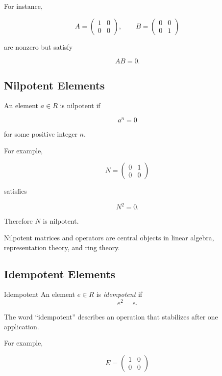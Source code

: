 For instance,

\[ A=\begin{pmatrix}1&0\\0&0\end{pmatrix},\qquad
B=\begin{pmatrix}0&0\\0&1\end{pmatrix} \]

are nonzero but satisfy

\[ AB=0. \]

\subsection{Nilpotent Elements}
\label{subsec:noncommutative-nilpotent}

An element \(a\in R\) is nilpotent if

\[ a^n=0 \]

for some positive integer \(n\).

For example,

\[ N=\begin{pmatrix}0&1\\0&0\end{pmatrix} \]

satisfies

\[ N^2=0. \]

Therefore \(N\) is nilpotent.

Nilpotent matrices and operators are central objects in linear algebra,
representation theory, and ring theory.

\subsection{Idempotent Elements}
\label{subsec:idempotent-elements}

\begin{definitionbox}{Idempotent}
An element \(e\in R\) is \emph{idempotent} if
\[ e^2=e. \]
\end{definitionbox}

The word ``idempotent'' describes an operation that stabilizes after one
application.

For example,

\[ E=\begin{pmatrix}1&0\\0&0\end{pmatrix} \]

